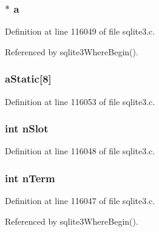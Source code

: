 \subsubsection[{a}]{$\ast$ a}\label{struct_where_clause_a1354a36e121d8d62cb85acf49711c092}


Definition at line 116049 of file sqlite3.\+c.



Referenced by sqlite3\+Where\+Begin().

\hypertarget{struct_where_clause_ad0405ae245a8c0ef140b0313d22e78b8}{}
\subsubsection[{a\+Static}]{ a\+Static\mbox{[}8\mbox{]}}\label{struct_where_clause_ad0405ae245a8c0ef140b0313d22e78b8}


Definition at line 116053 of file sqlite3.\+c.

\hypertarget{struct_where_clause_a85c0e0b1114302d7d4492192bb78025b}{}
\subsubsection[{n\+Slot}]{\setlength{\rightskip}{0pt plus 5cm}int n\+Slot}\label{struct_where_clause_a85c0e0b1114302d7d4492192bb78025b}


Definition at line 116048 of file sqlite3.\+c.

\hypertarget{struct_where_clause_adf762d1d5132698c906bace4882bb1cc}{}
\subsubsection[{n\+Term}]{\setlength{\rightskip}{0pt plus 5cm}int n\+Term}\label{struct_where_clause_adf762d1d5132698c906bace4882bb1cc}


Definition at line 116047 of file sqlite3.\+c.



Referenced by sqlite3\+Where\+Begin().

\hypertarget{struct_where_clause_a0991b29aa40e12f033237266ebe6610c}{}

